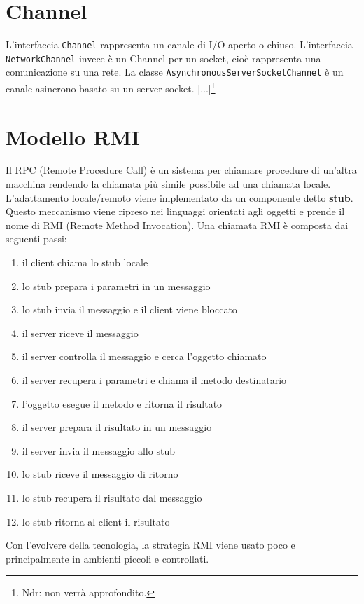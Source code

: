 \section{Channel}
L'interfaccia \texttt{Channel} rappresenta un canale di I/O aperto o chiuso. L'interfaccia \texttt{NetworkChannel} invece è un Channel per un socket, cioè rappresenta una comunicazione su una rete. 
La classe \texttt{AsynchronousServerSocketChannel} è un canale asincrono basato su un server socket. [...]\footnote{Ndr: non verrà approfondito.}

\section{Modello RMI}
Il RPC (Remote Procedure Call) è un sistema per chiamare procedure di un'altra macchina rendendo la chiamata più simile possibile ad una chiamata locale. L'adattamento locale/remoto viene implementato da un componente detto \textbf{stub}. Questo meccanismo viene ripreso nei linguaggi orientati agli oggetti e prende il nome di RMI (Remote Method Invocation). Una chiamata RMI è composta dai seguenti passi:
\begin{enumerate}
\item il client chiama lo stub locale
\item lo stub prepara i parametri in un messaggio
\item lo stub invia il messaggio e il client viene bloccato
\item il server riceve il messaggio
\item il server controlla il messaggio e cerca l'oggetto chiamato
\item il server recupera i parametri e chiama il metodo destinatario
\item l'oggetto esegue il metodo e ritorna il risultato
\item il server prepara il risultato in un messaggio
\item il server invia il messaggio allo stub
\item lo stub riceve il messaggio di ritorno
\item lo stub recupera il risultato dal messaggio
\item lo stub ritorna al client il risultato
\end{enumerate}
Con l'evolvere della tecnologia, la strategia RMI viene usato poco e principalmente in ambienti piccoli e controllati.